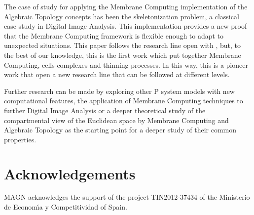 \documentclass[journal]{IEEEtran}
\begin{document}
The case of study for applying the Membrane Computing implementation of the
Algebraic Topology concepts has been the skeletonization problem, a classical
case study in Digital Image Analysis. This implementation provides a new proof
that the Membrane Computing framework is flexible enough to adapt to unexpected
situations. This paper follows the research line open with
\cite{ChristinalDR10}, but, to the best of our knowledge, this is the first work
which put together Membrane Computing, cells complexes and thinning processes.
In this way, this is a pioneer work that open a new research line that can be
followed at different levels.

Further research can be made by exploring other P system models with new
computational features, the application of Membrane Computing techniques to
further Digital Image Analysis or a deeper theoretical study of the
compartmental view of the Euclidean space by Membrane Computing and Algebraic
Topology as the starting point for a deeper study of their common properties.

\section*{Acknowledgements}
MAGN acknowledges the
support of the project TIN2012-37434 of the Ministerio de
Econom\'{\i}a y Competitividad of Spain.




\appendix
\end{document}
